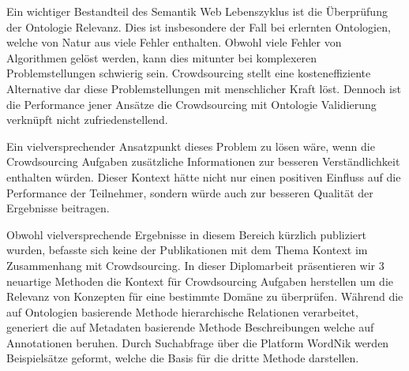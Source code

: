 \begin{kurzfassung}
	Ein wichtiger Bestandteil des Semantik Web Lebenszyklus ist die Überprüfung der Ontologie Relevanz. Dies ist insbesondere der Fall bei erlernten 
	Ontologien, welche von Natur aus viele Fehler enthalten. Obwohl viele Fehler von Algorithmen gelöst werden, kann dies mitunter bei komplexeren
	Problemstellungen schwierig sein. Crowdsourcing stellt eine kosteneffiziente Alternative dar diese Problemstellungen mit menschlicher Kraft löst. 
	Dennoch ist die Performance jener Ansätze die Crowdsourcing mit Ontologie Validierung verknüpft nicht zufriedenstellend. 
	
	Ein vielversprechender Ansatzpunkt dieses Problem zu lösen wäre, wenn die Crowdsourcing Aufgaben zusätzliche Informationen zur besseren
	Verständlichkeit enthalten würden. Dieser Kontext hätte nicht nur einen positiven Einfluss auf die Performance der Teilnehmer, sondern würde auch 
	zur besseren Qualität der Ergebnisse beitragen.
	
	Obwohl vielversprechende Ergebnisse in diesem Bereich kürzlich publiziert wurden, befasste sich keine der Publikationen mit dem Thema Kontext im
	Zusammenhang mit Crowdsourcing. In dieser Diplomarbeit präsentieren wir 3 neuartige Methoden die Kontext für Crowdsourcing Aufgaben herstellen um
	die Relevanz von Konzepten für eine bestimmte Domäne zu überprüfen. Während die auf Ontologien basierende Methode hierarchische Relationen
	verarbeitet, generiert die auf Metadaten basierende Methode Beschreibungen welche auf Annotationen beruhen. Durch Suchabfrage über die Platform
	WordNik	werden Beispielsätze geformt, welche die Basis für die dritte Methode darstellen. 
	
	
	
	
	
\end{kurzfassung}